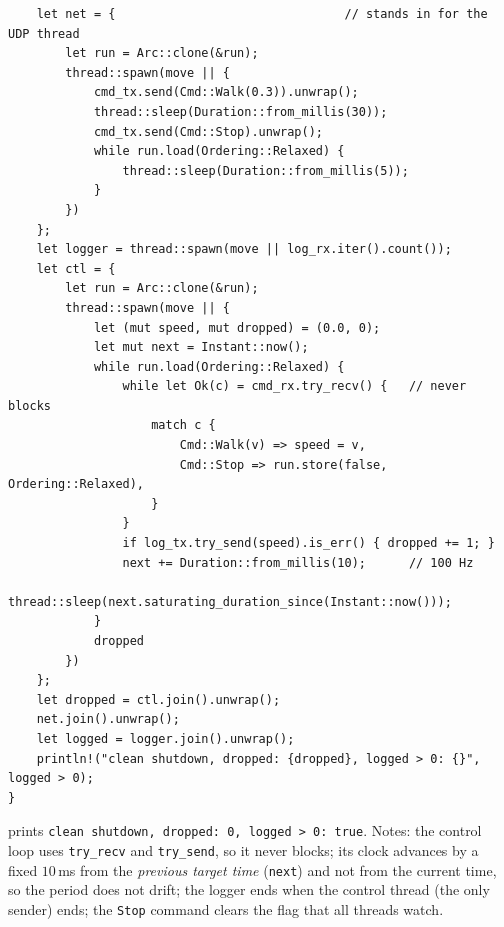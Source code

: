 \begin{enumerate}[label=\textbf{\ansnum.\arabic*}]
\begin{verbatim}
    let net = {                                // stands in for the UDP thread
        let run = Arc::clone(&run);
        thread::spawn(move || {
            cmd_tx.send(Cmd::Walk(0.3)).unwrap();
            thread::sleep(Duration::from_millis(30));
            cmd_tx.send(Cmd::Stop).unwrap();
            while run.load(Ordering::Relaxed) {
                thread::sleep(Duration::from_millis(5));
            }
        })
    };
    let logger = thread::spawn(move || log_rx.iter().count());
    let ctl = {
        let run = Arc::clone(&run);
        thread::spawn(move || {
            let (mut speed, mut dropped) = (0.0, 0);
            let mut next = Instant::now();
            while run.load(Ordering::Relaxed) {
                while let Ok(c) = cmd_rx.try_recv() {   // never blocks
                    match c {
                        Cmd::Walk(v) => speed = v,
                        Cmd::Stop => run.store(false, Ordering::Relaxed),
                    }
                }
                if log_tx.try_send(speed).is_err() { dropped += 1; }
                next += Duration::from_millis(10);      // 100 Hz
                thread::sleep(next.saturating_duration_since(Instant::now()));
            }
            dropped
        })
    };
    let dropped = ctl.join().unwrap();
    net.join().unwrap();
    let logged = logger.join().unwrap();
    println!("clean shutdown, dropped: {dropped}, logged > 0: {}", logged > 0);
}
\end{verbatim}
prints \verb!clean shutdown, dropped: 0, logged > 0: true!. Notes: the control loop uses \verb!try_recv! and \verb!try_send!, so it never blocks; its clock advances by a fixed $10$\,ms from the \emph{previous target time} (\verb!next!) and not from the current time, so the period does not drift; the logger ends when the control thread (the only sender) ends; the \verb!Stop! command clears the flag that all threads watch.
\end{enumerate}
